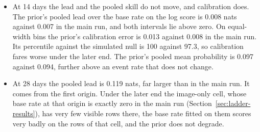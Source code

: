 \begin{itemize}
\item At 14 days the lead and the pooled skill do not move, and calibration does. The prior's pooled lead over the base rate on the log score is 0.008 nats against 0.007 in the main run, and both intervals lie above zero. On equal-width bins the prior's calibration error is 0.013 against 0.008 in the main run. Its percentile against the simulated null is 100 against 97.3, so calibration fares worse under the later end. The prior's pooled mean probability is 0.097 against 0.094, further above an event rate that does not change.
\item At 28 days the pooled lead is 0.119 nats, far larger than in the main run. It comes from the first origin. Under the later end the image-only cell, whose base rate at that origin is exactly zero in the main run (Section~\ref{sec:ladder-results}), has very few visible rows there, the base rate fitted on them scores very badly on the rows of that cell, and the prior does not degrade.

\end{itemize}

